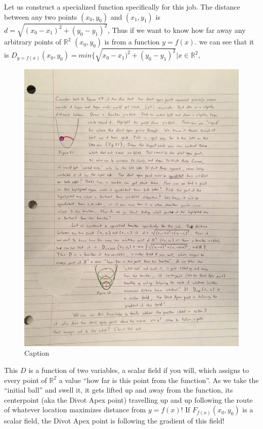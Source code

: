 Let us construct a specialized function specifically for this job. The distance between any two points $(x_0, y_0)$ and $(x_1, y_1)$ is $d = \sqrt{(x_0 - x_1)^2 + (y_0 - y_1)^2}$, Thus if we want to know how far away any arbitrary points of $\mathbb{R}^2$ $(x_0, y_0)$ is from a function $y = f(x)$. we can see that it is $D_{y = f(x)}(x_0, y_0) = min \{ \sqrt{x_0 - x_1)^2 + (y_0 - y_1)^2} | x \in \mathbb{R} ^ 2$,

\begin{figure}
  \includegraphics[width=.9\linewidth]{solving-divot-paths-img/Fig 12-52.png}
  \caption{Caption}
  \label{fig:fig12-52}
\end{figure}

This $D$ is a function of two variables, a scalar field if you will, which assigns to every point of $\mathbb{R} ^ 2$ a value ``how far is this point from the function''. As we take the ``initial ball'' and swell it, it gets lifted up and away from the function, its centerpoint (aka the Divot Apex point) travelling up and up following the route of whatever location maximizes distance from $y = f(x)$! If $F_{f(x)}(x_0, y_0)$ is a scalar field, the Divot Apex point is following the gradient of this field!

